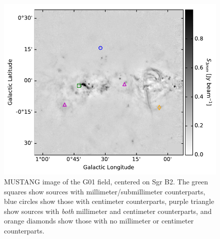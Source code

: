\documentclass[twocolumn]{aastex62}
\begin{document}


\begin{figure}[htp]
\includegraphics[width=17cm]{figures/G01_overview_withcatalog.pdf}
\caption{MUSTANG image of the G01 field, centered on Sgr B2.  The green squares show
sources with millimeter/submillimeter counterparts, blue circles show those
with centimeter counterparts, purple triangle show sources with \emph{both} millimeter
and centimeter counterparts, and orange diamonds show those with no millimeter
or centimeter counterparts.}
\label{fig:g01overview}
\end{figure}
\end{document}
